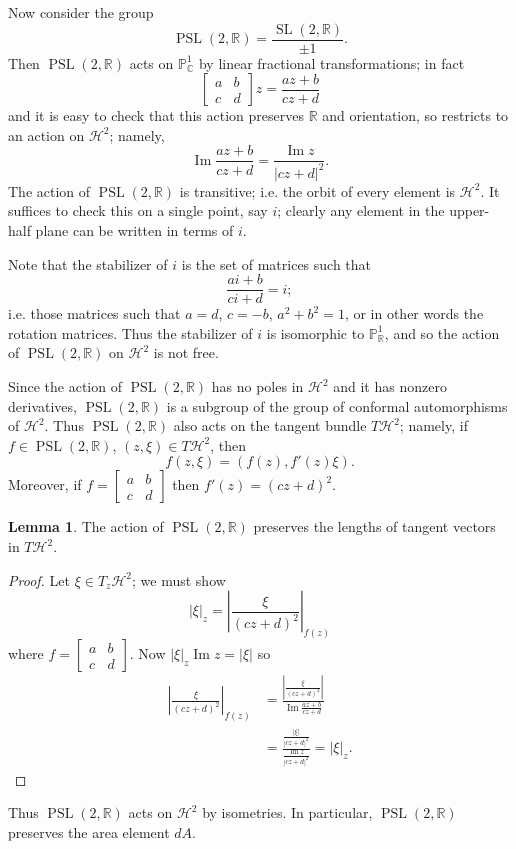 \documentclass[12pt]{report}
\newcommand{\RR}{\mathbb{R}}
\newcommand{\CC}{\mathbb{C}}
\newcommand{\PP}{\mathbb{P}}
\newcommand{\HH}{\mathcal H}
\newcommand{\PSL}{\operatorname{PSL}}
\newcommand{\SL}{\operatorname{SL}}
\renewcommand{\Im}{\operatorname{Im}}
\theoremstyle{definition}
\newtheorem{lemma}[theorem]{Lemma}
\begin{document}
Now consider the group
$$\PSL(2, \RR) = \frac{\SL(2, \RR)}{\pm 1}.$$
Then $\PSL(2, \RR)$ acts on $\PP^1_\CC$ by linear fractional transformations; in fact
$$\begin{bmatrix}a & b\\
c & d\end{bmatrix}z = \frac{az + b}{cz + d}$$
and it is easy to check that this action preserves $\RR$ and orientation, so restricts to an action on $\HH^2$; namely,
$$\Im \frac{az + b}{cz + d} = \frac{\Im z}{|cz + d|^2}.$$
The action of $\PSL(2, \RR)$ is transitive; i.e. the orbit of every element is $\HH^2$.
It suffices to check this on a single point, say $i$; clearly any element in the upper-half plane can be written in terms of $i$.

Note that the stabilizer of $i$ is the set of matrices such that
$$\frac{ai + b}{ci + d} = i;$$
i.e. those matrices such that $a=d$, $c=-b$, $a^2 + b^2 = 1$, or in other words the rotation matrices.
Thus the stabilizer of $i$ is isomorphic to $\PP^1_\RR$, and so the action of $\PSL(2, \RR)$ on $\HH^2$ is not free.

Since the action of $\PSL(2, \RR)$ has no poles in $\HH^2$ and it has nonzero derivatives, $\PSL(2, \RR)$ is a subgroup of the group of conformal automorphisms of $\HH^2$.
Thus $\PSL(2, \RR)$ also acts on the tangent bundle $T\HH^2$; namely, if $f \in \PSL(2, \RR)$, $(z, \xi) \in T\HH^2$, then
$$f(z, \xi) = (f(z), f'(z)\xi).$$
Moreover, if $f = \begin{bmatrix}a&b \\c&d\end{bmatrix}$ then $f'(z) = (cz + d)^2$.

\begin{lemma}
The action of $\PSL(2, \RR)$ preserves the lengths of tangent vectors in $T\HH^2$.
\end{lemma}
\begin{proof}
Let $\xi \in T_z\HH^2$; we must show
$$|\xi|_z = \left|\frac{\xi}{(cz + d)^2}\right|_{f(z)}$$
where $f = \begin{bmatrix}a&b \\c&d\end{bmatrix}$. Now $|\xi|_z \Im z = |\xi|$ so
\begin{align*}\left|\frac{\xi}{(cz + d)^2}\right|_{f(z)} &= \frac{\left|\frac{\xi}{(cz + d)^2}\right|}{\Im \frac{az+b}{cz + d}} \\
&= \frac{\frac{|\xi|}{|cz + d|^2}}{\frac{\Im z}{|cz + d|^2}} = |\xi|_z.\end{align*}
\end{proof}
Thus $\PSL(2, \RR)$ acts on $\HH^2$ by isometries. In particular, $\PSL(2, \RR)$ preserves the area element $dA$.
\end{document}
